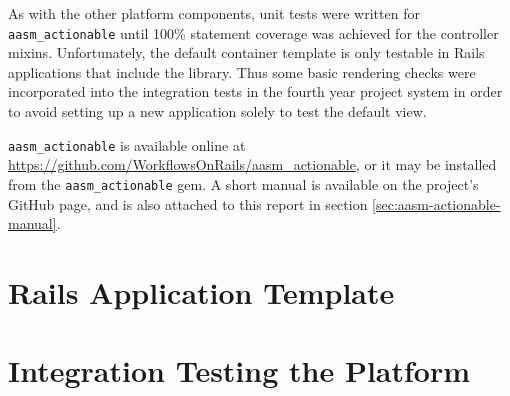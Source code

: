 \documentclass[document.tex]{subfiles}
\begin{document}
As with the other platform components, unit tests were written for \verb!aasm_actionable! until 100\% statement coverage was achieved for the controller mixins. Unfortunately, the default container template is only testable in Rails applications that include the library. Thus some basic rendering checks were incorporated into the integration tests in the fourth year project system in order to avoid setting up a new application solely to test the default view.

\verb!aasm_actionable! is available online at \url{https://github.com/WorkflowsOnRails/aasm_actionable}, or it may be installed from the \verb!aasm_actionable! gem.
A short manual is available on the project's GitHub page, and is also attached to this report in section \ref{sec:aasm-actionable-manual}.

\FloatBarrier


\section {Rails Application Template}



\section {Integration Testing the Platform}
\end{document}
